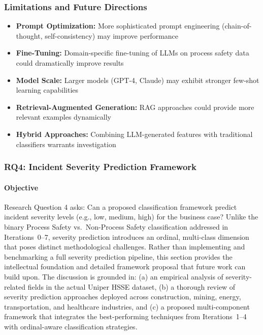 \documentclass[11pt, titlepage, bibliography=totoc]{scrreprt}
\begin{document}
\subsubsection{Limitations and Future Directions}

\begin{itemize}
    \item \textbf{Prompt Optimization:} More sophisticated prompt engineering (chain-of-thought, self-consistency) may improve performance
    \item \textbf{Fine-Tuning:} Domain-specific fine-tuning of LLMs on process safety data could dramatically improve results
    \item \textbf{Model Scale:} Larger models (GPT-4, Claude) may exhibit stronger few-shot learning capabilities
    \item \textbf{Retrieval-Augmented Generation:} RAG approaches could provide more relevant examples dynamically
    \item \textbf{Hybrid Approaches:} Combining LLM-generated features with traditional classifiers warrants investigation
\end{itemize}

\subsubsection{RQ4: Incident Severity Prediction Framework}
\label{sec:rq4_methodology}

\paragraph{Objective}
Research Question 4 asks: Can a proposed classification framework predict incident severity levels (e.g., low, medium, high) for the business case? Unlike the binary Process Safety vs.\ Non-Process Safety classification addressed in Iterations~0--7, severity prediction introduces an ordinal, multi-class dimension that poses distinct methodological challenges. Rather than implementing and benchmarking a full severity prediction pipeline, this section provides the intellectual foundation and detailed framework proposal that future work can build upon. The discussion is grounded in: (a) an empirical analysis of severity-related fields in the actual Uniper HSSE dataset, (b) a thorough review of severity prediction approaches deployed across construction, mining, energy, transportation, and healthcare industries, and (c) a proposed multi-component framework that integrates the best-performing techniques from Iterations~1--4 with ordinal-aware classification strategies.
\end{document}
